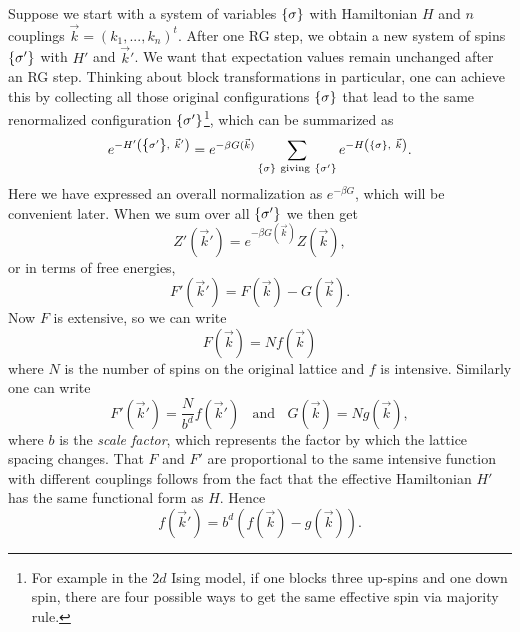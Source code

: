 Suppose we start with a system of variables $\left\{\sigma\right\}$ with Hamiltonian $H$
and $n$ couplings $\vec{k}=(k_1,...,k_n)^t$. After one RG step, we obtain
a new system of spins $\left\{\sigma'\right\}$ with $H'$ and $\vec{k}'$. We want
that expectation values remain unchanged after an RG step.
Thinking about block transformations in particular, one can
achieve this by collecting 
all those original configurations $\left\{\sigma\right\}$ that lead to the same
renormalized configuration $\left\{\sigma'\right\}$\footnote{For example in the 2$d$
Ising model, if one blocks three up-spins and one down spin, there are 
four possible ways to get the same effective spin via majority rule.}, which can be
summarized as
\begin{equation}
  e^{-H'\left(\left\{\sigma'\right\},~\vec{k}'\right)}
     =e^{-\beta G(\vec{k})}\sum_{\left\{\sigma\right\}~
                        {\rm giving}~\left\{\sigma'\right\}}
      e^{-H\left(\left\{\sigma\right\},~\vec{k}\right)}.
\end{equation}
Here we have expressed an overall normalization as $e^{-\beta G}$, which will
be convenient later. When we sum over all $\left\{\sigma'\right\}$ we then get
\begin{equation}
  Z'(\vec{k}')=e^{-\beta G(\vec{k})} Z(\vec{k}),
\end{equation}
or in terms of free energies,
\begin{equation}
  F'(\vec{k}')=F(\vec{k})-G(\vec{k}).
\end{equation}
Now $F$ is extensive, so we can write
\begin{equation}
  F(\vec{k})=Nf(\vec{k})
\end{equation}
where $N$ is the number of spins on the original lattice and $f$ is intensive.
Similarly one can write
\begin{equation}
  F'(\vec{k}')=\frac{N}{b^d}f(\vec{k}')~~~~\text{and}~~~~G(\vec{k})=Ng(\vec{k}),
\end{equation}
where $b$ is the {\it scale factor}, which represents the
factor by which the lattice spacing changes. That $F$ and $F'$ are proportional
to the same intensive function with different couplings follows from the fact
that the effective Hamiltonian $H'$ has the same functional form as $H$.
Hence
\begin{equation}\label{eq:widom1}
f(\vec{k}')=b^d\left(f(\vec{k})-g(\vec{k})\right).
\end{equation}


